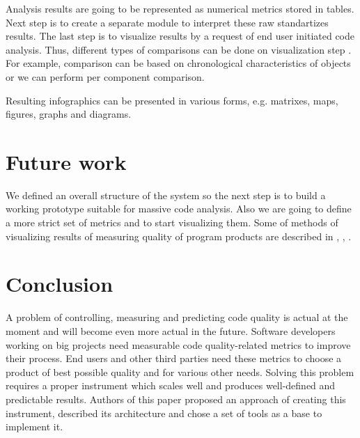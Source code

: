 \documentclass[runningheads,a4paper]{llncs}
\begin{document}
Analysis results are going to be represented as numerical metrics stored in
tables. Next step is to create a separate module to interpret these raw
standartizes results. The last step is to visualize results by a request of
end user initiated code analysis. Thus, different types of comparisons can be
done on visualization step \cite{item17}. For example, comparison can be based
on chronological characteristics of objects or we can perform per component comparison.

Resulting infographics can be presented in various forms, e.g. matrixes, maps,
figures, graphs and diagrams.

\section{Future work}

We defined an overall structure of the system so the next step is
to build a working prototype suitable for massive code analysis. Also
we are going to define a more strict set of metrics and to start
visualizing them. Some of methods of visualizing results of measuring
quality of program products are described in \cite{item18}, \cite{item19}, \cite{item20}.

\section{Conclusion}

A problem of controlling, measuring and predicting code quality is actual
at the moment and will become even more actual in the future. Software
developers working on big projects need measurable code quality-related
metrics to improve their process. End users and other third parties need
these metrics to choose a product of best possible quality and for various
other needs. Solving this problem requires a proper instrument which scales
well and produces well-defined and predictable results. Authors of this paper
proposed an approach of creating this instrument, described its architecture
and chose a set of tools as a base to implement it.
\end{document}
